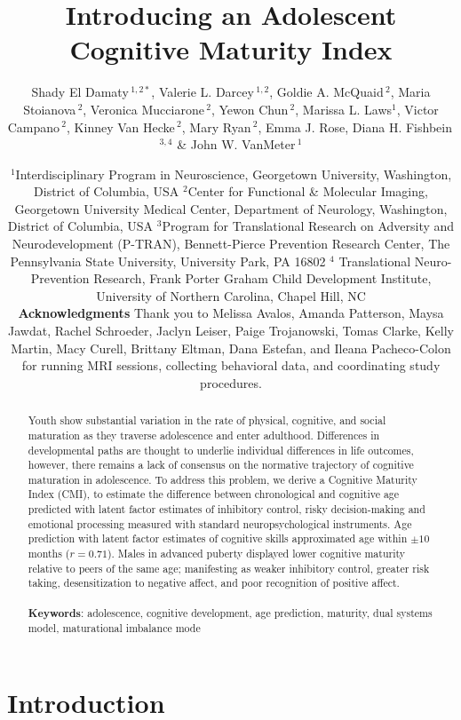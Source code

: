 \documentclass{article}%
\title{Introducing an Adolescent Cognitive Maturity Index}
\author{
\parbox{\linewidth}{\centering
Shady El Damaty\,$^{1,2*}$, Valerie L. Darcey\,$^{1,2}$, Goldie A. McQuaid\,$^{2}$, Maria Stoianova\,$^{2}$, Veronica Mucciarone\,$^{2}$, Yewon Chun\,$^{2}$, Marissa L. Laws$^{1}$, Victor Campano\,$^{2}$, Kinney Van Hecke\,$^{2}$, Mary Ryan\,$^{2}$, Emma J. Rose, Diana H. Fishbein\,$^{3,4}$ \& John W. VanMeter\,$^{1}$}
}
\date{\footnotesize{$^{1}$Interdisciplinary Program in Neuroscience, Georgetown University, Washington, District of Columbia, USA
$^{2}$Center for Functional \& Molecular Imaging, Georgetown University Medical Center, Department of Neurology, Washington, District of Columbia, USA
$^{3}$Program for Translational Research on Adversity and Neurodevelopment (P-TRAN), Bennett-Pierce Prevention Research Center, The Pennsylvania State University, University Park, PA 16802
$^{4}$ Translational Neuro-Prevention Research, Frank Porter Graham Child Development Institute, University of Northern Carolina, Chapel Hill, NC} \\  \vspace{5pt} \textbf{Acknowledgments}
Thank you to Melissa Avalos, Amanda Patterson, Maysa Jawdat, Rachel Schroeder, Jaclyn Leiser, Paige Trojanowski, Tomas Clarke, Kelly Martin, Macy Curell, Brittany Eltman, Dana Estefan, and Ileana Pacheco-Colon for running MRI sessions, collecting behavioral data, and coordinating study procedures. }
\begin{document}
\maketitle
\begin{abstract}
Youth show substantial variation in the rate of physical, cognitive, and social maturation as they traverse adolescence and enter adulthood. Differences in developmental paths are thought to underlie individual differences in life outcomes, however, there remains a lack of consensus on the normative trajectory of cognitive maturation in adolescence. To address this problem, we derive a Cognitive Maturity Index (CMI), to estimate the difference between chronological and cognitive age predicted with latent factor estimates of inhibitory control, risky decision-making and emotional processing measured with standard neuropsychological instruments. Age prediction with latent factor estimates of cognitive skills approximated age within $\pm 10$ months ($r=0.71$). Males in advanced puberty displayed lower cognitive maturity relative to peers of the same age; manifesting as weaker inhibitory control, greater risk taking, desensitization to negative affect, and poor recognition of positive affect.  \\ \\
\textbf{Keywords}: adolescence, cognitive development, age prediction, maturity, dual systems model, maturational imbalance mode
\end{abstract}
\section*{Introduction}
\end{document}
